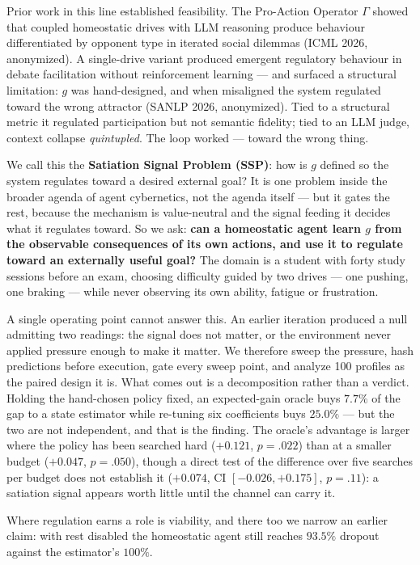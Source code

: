 \documentclass{article}
\begin{document}
Prior work in this line established feasibility. The Pro-Action Operator $\Gamma$ showed that coupled homeostatic drives with LLM reasoning produce behaviour differentiated by opponent type in iterated social dilemmas (ICML 2026, anonymized). A single-drive variant produced emergent regulatory behaviour in debate facilitation without reinforcement learning --- and surfaced a structural limitation: $g$ was hand-designed, and when misaligned the system regulated toward the wrong attractor (SANLP 2026, anonymized). Tied to a structural metric it regulated participation but not semantic fidelity; tied to an LLM judge, context collapse \emph{quintupled}. The loop worked --- toward the wrong thing.

We call this the \textbf{Satiation Signal Problem (SSP)}: how is $g$ defined so the system regulates toward a desired external goal? It is one problem inside the broader agenda of agent cybernetics, not the agenda itself --- but it gates the rest, because the mechanism is value-neutral and the signal feeding it decides what it regulates toward. So we ask: \textbf{can a homeostatic agent learn $g$ from the observable consequences of its own actions, and use it to regulate toward an externally useful goal?} The domain is a student with forty study sessions before an exam, choosing difficulty guided by two drives --- one pushing, one braking --- while never observing its own ability, fatigue or frustration.

A single operating point cannot answer this. An earlier iteration produced a null admitting two readings: the signal does not matter, or the environment never applied pressure enough to make it matter. We therefore sweep the pressure, hash predictions before execution, gate every sweep point, and analyze 100 profiles as the paired design it is. What comes out is a decomposition rather than a verdict. Holding the hand-chosen policy fixed, an expected-gain oracle buys $7.7\%$ of the gap to a state estimator while re-tuning six coefficients buys $25.0\%$ --- but the two are not independent, and that is the finding. The oracle's advantage is larger where the policy has been searched hard ($+0.121$, $p{=}.022$) than at a smaller budget ($+0.047$, $p{=}.050$), though a direct test of the difference over five searches per budget does not establish it ($+0.074$, CI $[-0.026,+0.175]$, $p{=}.11$): a satiation signal appears worth little until the channel can carry it.

Where regulation earns a role is viability, and there too we narrow an earlier claim: with rest disabled the homeostatic agent still reaches $93.5\%$ dropout against the estimator's $100\%$.
\end{document}
